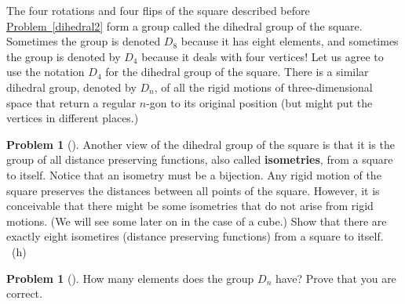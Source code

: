 \documentclass[10pt,]{book}
\newcommand{\terminology}[1]{\textbf{#1}}
\theoremstyle{plain}
\theoremstyle{definition}
\newtheorem{activity}[project]{Problem}
\theoremstyle{definition}
\numberwithin{equation}{chapter}
\begin{document}
\hypertarget{p-1508}{}%
The four rotations and four flips of the square described before \hyperref[dihedral2]{Problem~\ref{dihedral2}} form a group called the dihedral group of the square. Sometimes the group is denoted \(D_8\) because it has eight elements, and sometimes the group is denoted by \(D_4\) because it deals with four vertices! Let us agree to use the notation \(D_4\) for the dihedral group of the square. There is a similar dihedral group, denoted by \(D_{n}\), of all the rigid motions of three-dimensional space that return a regular \(n\)-gon to its original position (but might put the vertices in different places.)%
\begin{activity}[]\marginsymbol[-1em]{} \label{activity-261}
\hypertarget{p-1509}{}%
Another view of the dihedral group of the square is that it is the group of all distance preserving functions, also called \terminology{isometries},  from a square to itself.  Notice that an isometry must be a bijection.  Any rigid motion of the square preserves the distances between all points of the square.  However, it is conceivable that there might be some isometries that do not arise from rigid motions.  (We will see some later on in the case of a cube.)  Show that there are exactly eight isometires (distance preserving functions) from a square to itself.%
~{\tiny (h)}\end{activity}
\begin{activity}[]\marginsymbol[-1em]{} \label{activity-262}
\hypertarget{p-1512}{}%
How many elements does the group \(D_n\) have? Prove that you are correct.%
\end{activity}
\end{document}
